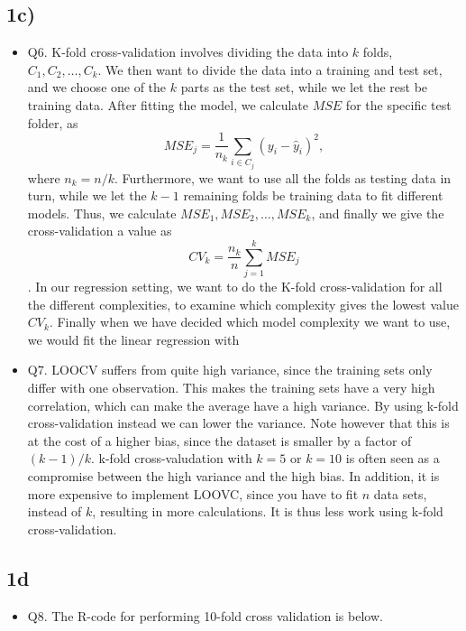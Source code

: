 \documentclass[]{article}
\providecommand{\tightlist}{%
  \setlength{\itemsep}{0pt}\setlength{\parskip}{0pt}}
\begin{document}
\subsection{1c)}\label{c}

\begin{itemize}
\tightlist
\item
  Q6. K-fold cross-validation involves dividing the data into \(k\)
  folds, \(C_1, C_2, \dots, C_k\). We then want to divide the data into
  a training and test set, and we choose one of the \(k\) parts as the
  test set, while we let the rest be training data. After fitting the
  model, we calculate \(MSE\) for the specific test folder, as
  \[MSE_j=\frac{1}{n_k}\sum_{i \in C_j}(y_i-\hat y_i)^2,\] where
  \(n_k=n/k\). Furthermore, we want to use all the folds as testing data
  in turn, while we let the \(k-1\) remaining folds be training data to
  fit different models. Thus, we calculate
  \(MSE_1, MSE_2,\dots, MSE_k\), and finally we give the
  cross-validation a value as \[CV_k=\frac{n_k}{n}\sum_{j=1}^k MSE_j\].
  In our regression setting, we want to do the K-fold cross-validation
  for all the different complexities, to examine which complexity gives
  the lowest value \(CV_k\). Finally when we have decided which model
  complexity we want to use, we would fit the linear regression with
\item
  Q7. LOOCV suffers from quite high variance, since the training sets
  only differ with one observation. This makes the training sets have a
  very high correlation, which can make the average have a high
  variance. By using k-fold cross-validation instead we can lower the
  variance. Note however that this is at the cost of a higher bias,
  since the dataset is smaller by a factor of \((k-1)/k\). k-fold
  cross-valudation with \(k=5\) or \(k=10\) is often seen as a
  compromise between the high variance and the high bias. In addition,
  it is more expensive to implement LOOVC, since you have to fit \(n\)
  data sets, instead of \(k\), resulting in more calculations. It is
  thus less work using k-fold cross-validation.
\end{itemize}

\subsection{1d}\label{d}

\begin{itemize}
\tightlist
\item
  Q8. The R-code for performing 10-fold cross validation is below.
\end{itemize}
\end{document}
